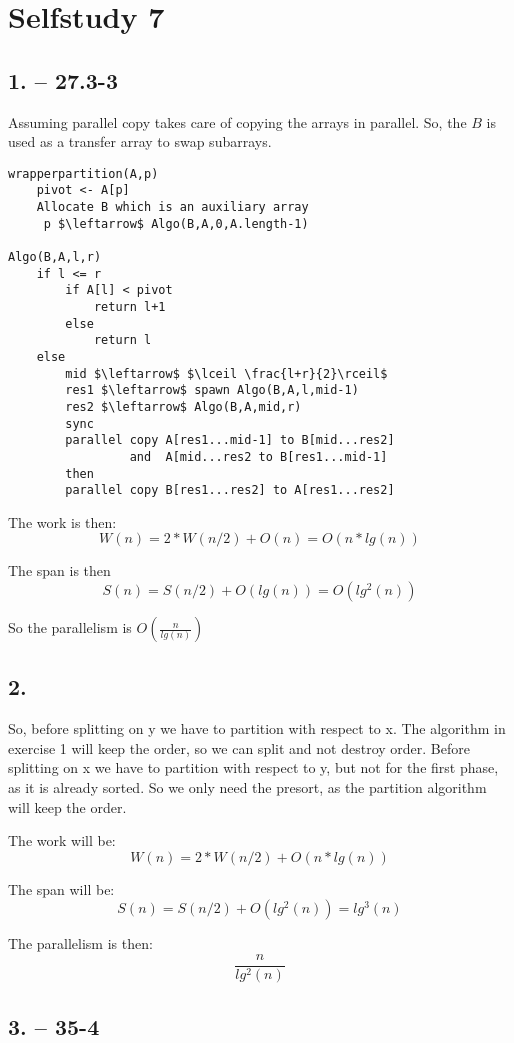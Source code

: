 \documentclass[12pt,a4paper]{report}
\begin{document}
\chapter*{Selfstudy 7}
\section*{1. -- 27.3-3}
Assuming parallel copy takes care of copying the arrays in parallel.
So, the $B$ is used as a transfer array to swap subarrays.

\begin{lstlisting}
wrapperpartition(A,p)
	pivot <- A[p]
	Allocate B which is an auxiliary array
     p $\leftarrow$ Algo(B,A,0,A.length-1)
     
Algo(B,A,l,r)
	if l <= r
		if A[l] < pivot
			return l+1
		else
			return l
	else
		mid $\leftarrow$ $\lceil \frac{l+r}{2}\rceil$
		res1 $\leftarrow$ spawn Algo(B,A,l,mid-1)
		res2 $\leftarrow$ Algo(B,A,mid,r)
		sync
		parallel copy A[res1...mid-1] to B[mid...res2]
			     and  A[mid...res2 to B[res1...mid-1]
		then 
		parallel copy B[res1...res2] to A[res1...res2]
\end{lstlisting}

The work is then:
$$W(n) = 2*W(n/2) + O(n) = O(n*lg(n))$$

The span is then
$$S(n) = S(n/2) + O(lg(n)) = O(lg^2(n))$$

So the parallelism is $O(\frac{n}{lg(n)})$

\section*{2.}
So, before splitting on y we have to partition with respect to x.
The algorithm in exercise 1 will keep the order, so we can split and not destroy order.
Before splitting on x we have to partition with respect to y, but not for the first phase, as it is already sorted.
So we only need the presort, as the partition algorithm will keep the order.

The work will be:
$$W(n) = 2* W(n/2) + O(n*lg(n))$$

The span will be:
$$S(n) = S(n/2) + O(lg^2(n)) = lg^3(n)$$

The parallelism is then:
$$\frac{n}{lg^2(n)}$$

\section*{3. -- 35-4}
\end{document}
